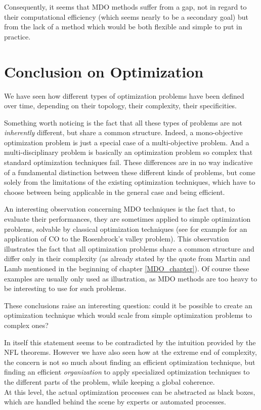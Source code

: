 Consequently, it seems that MDO methods suffer from a gap, not in regard to their computational efficiency (which seems nearly to be a secondary goal) but from the lack of a method which would be both flexible and simple to put in practice.

\chapter*{Conclusion on Optimization}

We have seen how different types of optimization problems have been defined over time, depending on their topology, their complexity, their specificities.

Something worth noticing is the fact that all these types of problems are not \emph{inherently} different, but share a common structure. Indeed, a mono-objective optimization problem is just a special case of a multi-objective problem. And a multi-disciplinary problem is basically an optimization problem so complex that standard optimization techniques fail. These differences are in no way indicative of a fundamental distinction between these different kinds of problems, but come solely from the limitations of the existing optimization techniques, which have to choose between being applicable in the general case and being efficient.

An interesting observation concerning MDO techniques is the fact that, to evaluate their performances, they are sometimes applied to simple optimization problems, solvable by classical optimization techniques (see for example \cite{Kroo:1994:MOM} for an application of CO to the Rosenbrock's valley problem). This observation illustrates the fact that all optimization problems share a common structure and differ only in their complexity (as already stated by the quote from Martin and Lamb mentioned in the beginning of chapter \ref{MDO_chapter}). Of course these examples are usually only used as illustration, as MDO methods are too heavy to be interesting to use for such problems.

These conclusions raise an interesting question: could it be possible to create an optimization technique which would scale from simple optimization problems to complex ones?

In itself this statement seems to be contradicted by the intuition provided by the NFL theorems. However we have also seen how at the extreme end of complexity, the concern is not so much about finding an efficient optimization technique, but finding an efficient \emph{organization} to apply specialized optimization techniques to the different parts of the problem, while keeping a global coherence.\\
At this level, the actual optimization processes can be abstracted as black boxes, which are handled behind the scene by experts or automated processes.

